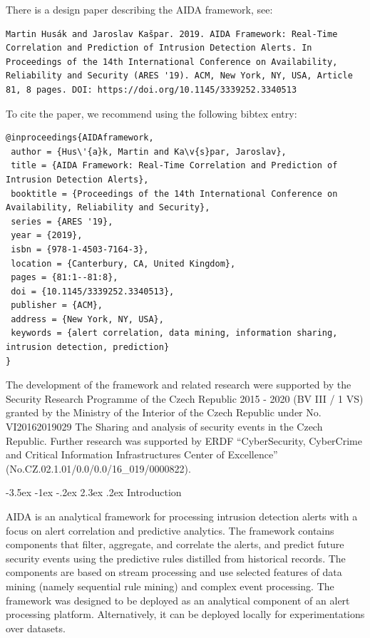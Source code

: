 \documentclass[a4paper]{article} %
\makeatletter
\renewcommand\section{\@startsection {section}{1}{\z@}%
                   {-3.5ex \@plus -1ex \@minus -.2ex}%
                   {2.3ex \@plus.2ex}%
                   {\normalfont\sffamily\Large\bfseries\color{projectcolor}}}
\makeatother
\begin{document}
There is a design paper describing the AIDA framework, see:
\begin{lstlisting}[]
Martin Husák and Jaroslav Kašpar. 2019. AIDA Framework: Real-Time Correlation and Prediction of Intrusion Detection Alerts. In Proceedings of the 14th International Conference on Availability, Reliability and Security (ARES '19). ACM, New York, NY, USA, Article 81, 8 pages. DOI: https://doi.org/10.1145/3339252.3340513
\end{lstlisting}

To cite the paper, we recommend using the following bibtex entry:
\begin{lstlisting}[]
@inproceedings{AIDAframework,
 author = {Hus\'{a}k, Martin and Ka\v{s}par, Jaroslav},
 title = {AIDA Framework: Real-Time Correlation and Prediction of Intrusion Detection Alerts},
 booktitle = {Proceedings of the 14th International Conference on Availability, Reliability and Security},
 series = {ARES '19},
 year = {2019},
 isbn = {978-1-4503-7164-3},
 location = {Canterbury, CA, United Kingdom},
 pages = {81:1--81:8},
 doi = {10.1145/3339252.3340513},
 publisher = {ACM},
 address = {New York, NY, USA},
 keywords = {alert correlation, data mining, information sharing, intrusion detection, prediction}
}
\end{lstlisting}

The development of the framework and related research were supported by the Security Research Programme of the Czech Republic 2015 - 2020 (BV III / 1 VS) granted by the Ministry of the Interior of the Czech Republic under No. VI20162019029 The Sharing and analysis of security events in the Czech Republic. 
Further research was supported by ERDF ``CyberSecurity, CyberCrime and Critical Information Infrastructures Center of Excellence'' (No.CZ.02.1.01/0.0/0.0/16\_019/0000822).

\cleardoublepage

\section{Introduction}

AIDA is an analytical framework for processing intrusion detection alerts with a focus on alert correlation and predictive analytics. The framework contains components that filter, aggregate, and correlate the alerts, and predict future security events using the predictive rules distilled from historical records. The components are based on stream processing and use selected features of data mining (namely sequential rule mining) and complex event processing. The framework was designed to be deployed as an analytical component of an alert processing platform. Alternatively, it can be deployed locally for experimentations over datasets.
\end{document}
